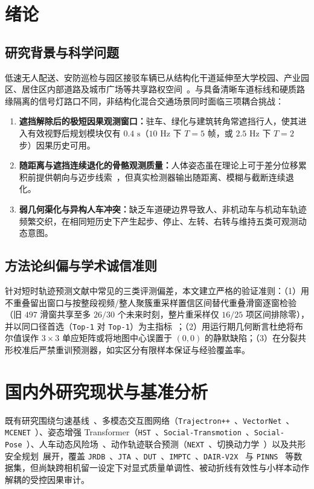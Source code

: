 \documentclass[UTF8,a4paper,12pt,openany,oneside]{ctexrep}
\begin{document}
\chapter{绪论}
\section{研究背景与科学问题}
低速无人配送、安防巡检与园区接驳车辆已从结构化干道延伸至大学校园、产业园区、居住区内部道路及城市广场等共享路权空间~\cite{rasouli2020av,rudenko2020survey,korbmacher2022review}。与具备清晰车道标线和硬质路缘隔离的信号灯路口不同，非结构化混合交通场景同时面临三项耦合挑战：
\begin{enumerate}
  \item \textbf{遮挡解除后的极短因果观测窗口：}驻车、绿化与建筑转角常遮挡行人，使其进入有效视野后规划模块仅有 $0.4\text{ s}$（$10\text{ Hz}$ 下 $T=5$ 帧，或 $2.5\text{ Hz}$ 下 $T=2$ 步）因果历史可用。
  \item \textbf{随距离与遮挡连续退化的骨骼观测质量：}人体姿态虽在理论上可于差分位移累积前提供朝向与迈步线索~\cite{salzmann2023hst,saadatnejad2024transmotion}，但真实检测器输出随距离、模糊与截断连续退化。
  \item \textbf{弱几何渠化与异构人车冲突：}缺乏车道硬边界导致人、非机动车与机动车轨迹频繁交织，在相同短历史下产生起步、停止、左转、右转与维持五类可观测动态意图。
\end{enumerate}

\section{方法论纠偏与学术诚信准则}
针对短时轨迹预测文献中常见的三类评测偏差，本文建立严格的验证准则：（1）用不重叠留出窗口与按整段视频/整人聚簇重采样置信区间替代重叠滑窗逐窗检验（旧 $497$ 滑窗共享至多 $26/30$ 个未来时刻，整片重采样仅 $16/25$ 项区间排除零），并以同口径首选（\texttt{Top-1} 对 \texttt{Top-1}）为主指标~\cite{scholler2020cv}；（2）用运行期几何断言杜绝将布尔值误作 $3\times 3$ 单应矩阵或将地图中心误置于 $(0,0)$ 的静默缺陷；（3）在分裂共形校准后严禁重训预测器，如实区分有限样本保证与经验覆盖率。

\chapter{国内外研究现状与基准分析}
既有研究围绕匀速基线~\cite{scholler2020cv}、多模态交互图网络（\texttt{Trajectron++}~\cite{salzmann2020trajectron}、\texttt{VectorNet}~\cite{gao2020vectornet}、\texttt{MCENET}~\cite{cheng2020mcenet}）、姿态增强 Transformer（\texttt{HST}~\cite{salzmann2023hst}、\texttt{Social-Transmotion}~\cite{saadatnejad2024transmotion}、\texttt{Social-Pose}~\cite{gao2025socialpose}）、人车动态风险场~\cite{wu2024riskfield}、动作轨迹联合预测（\texttt{NEXT}~\cite{liang2019next}、切换动力学~\cite{kooij2019switching}）以及共形安全规划~\cite{lindemann2023conformal,lei2018conformal}展开，覆盖 \texttt{JRDB}~\cite{martin2023jrdb}、\texttt{JTA}~\cite{fabbri2018jta}、\texttt{DUT}~\cite{yang2019dut}、\texttt{IMPTC}~\cite{hetzel2023imptc}、\texttt{DAIR-V2X}~\cite{yu2022dair} 与 \texttt{PINNS}~\cite{peng2026pinns} 等数据集，但尚缺跨相机留一设定下对显式质量单调性、被动折线有效性与小样本动作解耦的受控因果审计。
\end{document}
